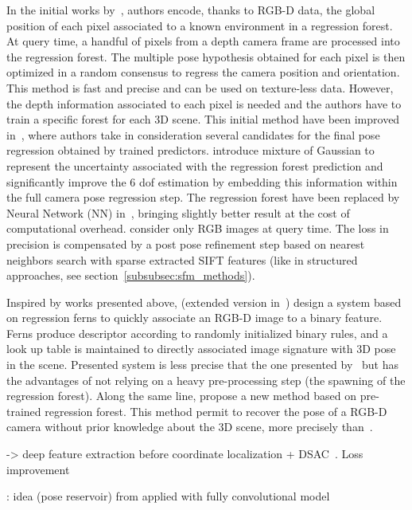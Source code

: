 In the initial works by~\citet{Shotton2013}, authors encode, thanks to RGB-D data, the global position of each pixel associated to a known environment in a regression forest. At query time, a handful of pixels from a depth camera frame are processed into the regression forest. The multiple pose hypothesis obtained for each pixel is then optimized in a random consensus to regress the camera position and orientation. This method is fast and precise and can be used on texture-less data. However, the depth information associated to each pixel is needed and the authors have to train a specific forest for each 3D scene. This initial method have been improved in~\citep{Guzman-rivera2014}, where authors take in consideration several candidates for the final pose regression obtained by trained predictors. \citet{Valentin2015} introduce mixture of Gaussian to represent the uncertainty associated with the regression forest prediction and significantly improve the 6 \ac{dof} estimation by embedding this information within the full camera pose regression step. The regression forest have been replaced by Neural Network (NN) in~\citep{Massiceti2016}, bringing slightly better result at the cost of computational overhead. \citet{Meng2016} consider only RGB images at query time. The loss in precision is compensated by a post pose refinement step based on nearest neighbors search with sparse extracted SIFT features (like in structured approaches, see section~\ref{subsubsec:sfm_methods}).

Inspired by works presented above, \citet{Glocker2013} (extended version in~\citep{Glocker2015}) design a system based on regression ferns to quickly associate an RGB-D image to a binary feature. Ferns produce descriptor according to randomly initialized binary rules, and a look up table is maintained to directly associated image signature with 3D pose in the scene. Presented system is less precise that the one presented by~\citet{Shotton2013} but has the advantages of not relying on a heavy pre-processing step (\ie the spawning of the regression forest). Along the same line, \citet{Cavallari, Cavallari2018} propose a new method based on pre-trained regression forest. This method permit to recover the pose of a RGB-D camera without prior knowledge about the 3D scene, more precisely than~\citet{Glocker2013,Glocker2015}. 

\citep{Brachmann2017b} -> deep feature extraction before coordinate localization + DSAC~\citep{Brachmann2017}. Loss improvement~\citep{Li2018}

\citep{Cavallari2019}: idea (pose reservoir) from applied with \citep{Brachmann2017b} fully convolutional model

